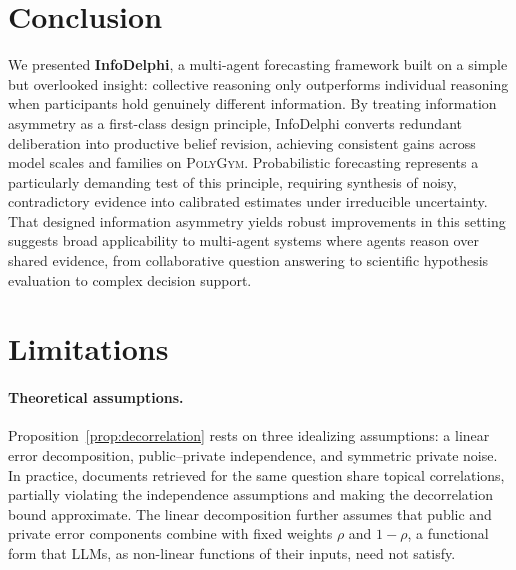 \documentclass[11pt]{article}
\theoremstyle{plain}
\theoremstyle{definition}
\begin{document}
\section{Conclusion}
\label{sec:conclusion}
We presented \textbf{InfoDelphi}, a multi-agent forecasting framework built on a simple but overlooked insight: collective reasoning only outperforms individual reasoning when participants hold genuinely different information.
By treating information asymmetry as a first-class design principle, InfoDelphi converts redundant deliberation into productive belief revision, achieving consistent gains across model scales and families on \textsc{PolyGym}.
Probabilistic forecasting represents a particularly demanding test of this principle, requiring synthesis of noisy, contradictory evidence into calibrated estimates under irreducible uncertainty.
That designed information asymmetry yields robust improvements in this setting suggests broad applicability to multi-agent systems where agents reason over shared evidence, from collaborative question answering to scientific hypothesis evaluation to complex decision support.
  
\section*{Limitations}

  \paragraph{Theoretical assumptions.}
  Proposition~\ref{prop:decorrelation} rests on three idealizing assumptions:  a linear error decomposition, public--private independence, and symmetric private noise. In practice, documents retrieved for the same question share topical correlations,
  partially violating the independence assumptions and making the decorrelation bound
  approximate. The linear decomposition further assumes that public and private error components
  combine with fixed weights $\rho$ and $1{-}\rho$, a functional form that LLMs,
  as non-linear functions of their inputs, need not satisfy.

\end{document}
